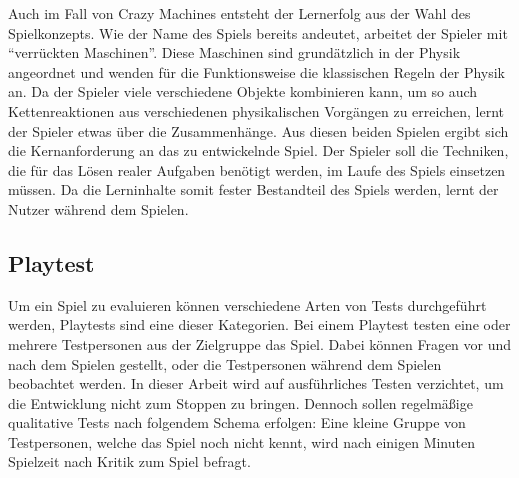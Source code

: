 		Auch im Fall von Crazy Machines entsteht der Lernerfolg aus der Wahl des Spielkonzepts. Wie der Name des Spiels bereits andeutet, arbeitet der Spieler mit \enquote{verrückten Maschinen}. Diese Maschinen sind grundätzlich in der Physik angeordnet und wenden für die Funktionsweise die klassischen Regeln der Physik an. Da der Spieler viele verschiedene Objekte kombinieren kann, um so auch Kettenreaktionen aus verschiedenen physikalischen Vorgängen zu erreichen, lernt der Spieler etwas über die Zusammenhänge.
		Aus diesen beiden Spielen ergibt sich die Kernanforderung an das zu entwickelnde Spiel. Der Spieler soll die Techniken, die für das Lösen realer Aufgaben benötigt werden, im Laufe des Spiels einsetzen müssen. Da die Lerninhalte somit fester Bestandteil des Spiels werden, lernt der Nutzer während dem Spielen.

\subsection{Playtest}\label{sec:playtest}
	Um ein Spiel zu evaluieren können verschiedene Arten von Tests durchgeführt werden, Playtests sind eine dieser Kategorien. Bei einem Playtest testen eine oder mehrere Testpersonen aus der Zielgruppe das Spiel. Dabei können Fragen vor und nach dem Spielen gestellt, oder die Testpersonen während dem Spielen beobachtet werden.
	In dieser Arbeit wird auf ausführliches Testen verzichtet, um die Entwicklung nicht zum Stoppen zu bringen. Dennoch sollen regelmäßige qualitative Tests nach folgendem Schema erfolgen: Eine kleine Gruppe von Testpersonen, welche das Spiel noch nicht kennt, wird nach einigen Minuten Spielzeit nach Kritik zum Spiel befragt.
